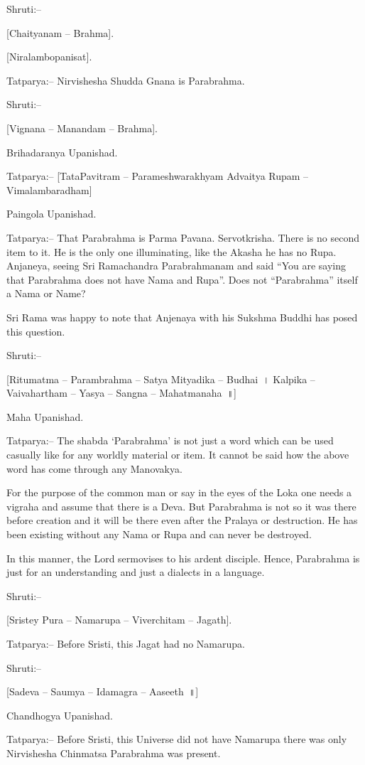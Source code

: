 Shruti:–

[Chaityanam – Brahma].

[Niralambopanisat].

Tatparya:– Nirvishesha Shudda Gnana is Parabrahma.

Shruti:–

[Vignana – Manandam – Brahma].

Brihadaranya Upanishad.

Tatparya:– [TataPavitram – Parameshwarakhyam Advaitya Rupam – Vimalambaradham]

Paingola Upanishad.

Tatparya:– That Parabrahma is Parma Pavana. Servotkrisha. There is no second item to it. He is the only one illuminating, like the Akasha he has no Rupa. Anjaneya, seeing Sri Ramachandra Parabrahmanam and said “You are saying that Parabrahma does not have Nama and Rupa”. Does not “Parabrahma” itself a Nama or Name?

Sri Rama was happy to note that Anjenaya with his Sukshma Buddhi has posed this question.

Shruti:–

[Ritumatma – Parambrahma – Satya Mityadika – Budhai~। Kalpika – Vaivahartham – Yasya – Sangna – Mahatmanaha~॥]

Maha Upanishad.

Tatparya:– The shabda ‘Parabrahma’ is not just a word which can be used casually like for any worldly material or item. It cannot be said how the above word has come through any Manovakya.

For the purpose of the common man or say in the eyes of the Loka one needs a vigraha and assume that there is a Deva. But Parabrahma is not so it was there before creation and it will be there even after the Pralaya or destruction. He has been existing without any Nama or Rupa and can never be destroyed.

In this manner, the Lord sermovises to his ardent disciple. Hence, Parabrahma is just for an understanding and just a dialects in a language.

Shruti:–

[Sristey Pura – Namarupa – Viverchitam – Jagath].

Tatparya:– Before Sristi, this Jagat had no Namarupa.

Shruti:–

[Sadeva – Saumya – Idamagra – Aaseeth~॥]

Chandhogya Upanishad.

Tatparya:– Before Sristi, this Universe did not have Namarupa there was only Nirvishesha Chinmatsa Parabrahma was present.

